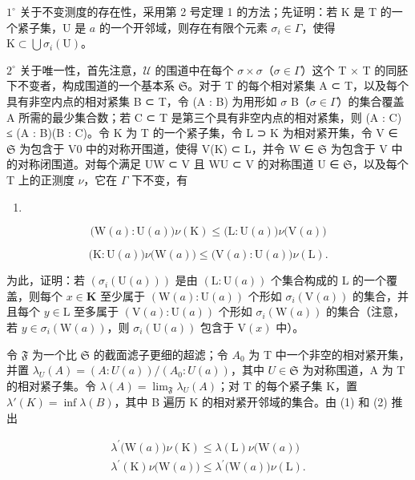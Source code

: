\(1^{\circ}\) 关于不变测度的存在性，采用第 2 号定理 1 的方法；先证明：若 K 是 T 的一个紧子集，U 是 \(a\) 的一个开邻域，则存在有限个元素 \(\sigma_{i} \in \Gamma\)，使得 \(\mathrm{K} \subset \bigcup \sigma_{i}(\mathrm{U})\)。

\(2^{\circ}\) 关于唯一性，首先注意，\(\mathcal{U}\) 的围道中在每个 \(\sigma \times \sigma\)（\(\sigma \in \Gamma\)）这个 T × T 的同胚下不变者，构成围道的一个基本系 \(\mathfrak{S}\)。对于 T 的每个相对紧集 A ⊂ T，以及每个具有非空内点的相对紧集 B ⊂ T，令 (A : B) 为用形如 \(\sigma\) B（\(\sigma \in \Gamma\)）的集合覆盖 A 所需的最少集合数；若 C ⊂ T 是第三个具有非空内点的相对紧集，则 (A : C) ≤ (A : B)(B : C)。令 K 为 T 的一个紧子集，令 L ⊃ K 为相对紧开集，令 V ∈ \(\mathfrak{S}\) 为包含于 V0 中的对称开围道，使得 V(K) ⊂ L，并令 W ∈ \(\mathfrak{S}\) 为包含于 V 中的对称闭围道。对每个满足 UW ⊂ V 且 WU ⊂ V 的对称围道 U ∈ \(\mathfrak{S}\)，以及每个 T 上的正测度 \(\nu\)，它在 \(\Gamma\) 下不变，有

\begin{enumerate}
\def\labelenumi{(\arabic{enumi})}
\tightlist
\item
\end{enumerate}

\[
\big (\mathrm{W} (a): \mathrm{U} (a) \big) \nu (\mathrm{K}) \leqslant \big (\mathrm{L}: \mathrm{U} (a) \big) \nu \big (\mathrm{V} (a) \big)\tag{2}
\]

\[
\bigl (\mathrm{K}: \mathrm{U} (a) \bigr) \nu \bigl (\mathrm{W} (a) \bigr) \leqslant \bigl (\mathrm{V} (a): \mathrm{U} (a) \bigr) \nu (\mathrm{L}).
\]

为此，证明：若 \((\sigma_i(\mathrm{U}(a)))\) 是由 \((\mathrm{L}:\mathrm{U}(a))\) 个集合构成的 L 的一个覆盖，则每个 \(x\in \mathbf{K}\) 至少属于 \((\mathrm{W}(a):\mathrm{U}(a))\) 个形如 \(\sigma_{i}(\mathrm{V}(a))\) 的集合，并且每个 \(y\in \mathrm{L}\) 至多属于 \((\mathrm{V}(a):\mathrm{U}(a))\) 个形如 \(\sigma_{i}(\mathrm{W}(a))\) 的集合（注意，若 \(y\in \sigma_i(\mathrm{W}(a))\)，则 \(\sigma_{i}(\mathrm{U}(a))\) 包含于 \(\mathrm{V}(x)\) 中）。

令 \(\mathfrak{F}\) 为一个比 \(\mathfrak{S}\) 的截面滤子更细的超滤；令 \(A_0\) 为 T 中一个非空的相对紧开集，并置 \(\lambda_U(A) = (A: U(a)) / (A_0: U(a))\)，其中 \(U \in \mathfrak{S}\) 为对称围道，A 为 T 的相对紧子集。令 \(\lambda(A) = \lim_{\mathfrak{F}} \lambda_U(A)\)；对 T 的每个紧子集 K，置 \(\lambda'(K) = \inf \lambda(B)\)，其中 B 遍历 K 的相对紧开邻域的集合。由 (1) 和 (2) 推出

\[
\begin{array}{r} \lambda^ {\prime} \big (\mathrm{W} (a) \big) \nu (\mathrm{K}) \leqslant \lambda (\mathrm{L}) \nu \big (\mathrm{W} (a) \big) \\ \lambda^ {\prime} (\mathrm{K}) \nu \big (\mathrm{W} (a) \big) \leqslant \lambda^ {\prime} \big (\mathrm{W} (a) \big) \nu (\mathrm{L}). \end{array}
\]


